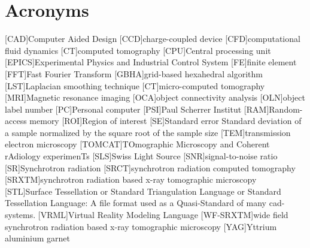     \chapter*{Acronyms}
	\begin{acronym}[ACRONYM]
		[CAD]{Computer Aided Design}
		[CCD]{charge-coupled device}
		[CFD]{computational fluid dynamics}
		[CT]{computed tomography}
		[CPU]{Central processing unit}
		[EPICS]{Experimental Physics and Industrial Control System}
		[FE]{finite element}
		[FFT]{Fast Fourier Transform}
		{grid-based hexahedral algorithm}
		[LST]{Laplacian smoothing technique}
		[\micro CT]{micro-computed tomography}
		[MRI]{Magnetic resonance imaging}
		[OCA]{object connectivity analysis}
		[OLN]{object label number}
		[PC]{Personal computer}
		[PSI]{Paul Scherrer Institut}
		[RAM]{Random-access memory}
		[ROI]{Region of interest}
		[SE]{Standard error} Standard deviation of a sample normalized by the square root of the sample size
		[TEM]{transmission electron microscopy}
		[TOMCAT]{TOmographic Microscopy and Coherent rAdiology experimenTs}
		[SLS]{Swiss Light Source}
		[SNR]{signal-to-noise ratio}
		[SR]{Synchrotron radiation}
		{synchrotron radiation computed tomography}
		[SRXTM]{synchrotron radiation based x-ray tomographic microscopy}
		[STL]{Surface Tessellation or Standard Triangulation Language or Standard Tessellation Language}: A file format used as a Quasi-Standard of many \acs{cad}-systems.
		{Virtual Reality Modeling Language}
		[WF-SRXTM]{wide field synchrotron radiation based x-ray tomographic microscopy}
		[YAG]{Yttrium aluminium garnet}
	\end{acronym}
\endgroup

\cleardoublepage